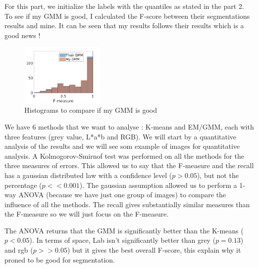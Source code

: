 \documentclass[runningheads,a4paper]{llncs}
\begin{document}
For this part, we initialize the labels with the quantiles as stated in the part 2.
To see if my GMM is good, I calculated the F-score between their segmentations results and mine. It can be seen that my results follows their results which is a good news !

\begin{figure}
\centering
\includegraphics[height=3cm]{Figures/hist_mygmm_their}
\caption{Histograms to compare if my GMM is good}
\end{figure}

\par We have 6 methods that we want to analyse : K-means and EM/GMM, each with three features (grey value, L*a*b and RGB). We will start by a quantitative analysis of the results and we will see som example of images for quantitative analysis.
A Kolmogorov-Smirnof test was performed on all the methods for the three measures of errors. This allowed us to say that the F-measure and the recall has a gaussian distributed law with a confidence level ($p>0.05$), but not the percentage ($p<<0.001$). The gaussian assumption allowed us to perform a 1-way ANOVA (because we have just one group of images) to compare the influence of all the methods.  The recall gives substantially similar measures than the F-measure so we will just focus on the F-measure. 
\par The ANOVA returns that the GMM is significantly better than the K-means ($p<0.05$). In terms of space, Lab isn't significantly better than grey ($p=0.13$) and rgb ($p>>0.05$) but it gives the best overall F-score, this explain why it proned to be good for segmentation. 
\end{document}
